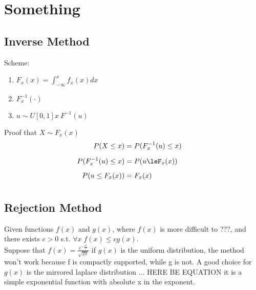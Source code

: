 
\chapter{Something}

\section{Inverse Method}
Scheme:
\begin{enumerate}
    \item $F_x(x) = \int^x_{-\infty}f_x(x)dx $
    \item $F_x^{-1}(\cdot)$
    \item  $u \sim U[0,1] x~F^{-1}(u)$
\end{enumerate}

\begin{myproof}
    Proof that $X \sim F_x(x)$\\
    \begin{equation}
        \begin{aligned}
            P(X\le x)&= P(F_x^{-1}(u)\le x)&\mbox{}\\[1.25ex]
            P(F_x^{-1}(u)\le x)&=P(u\leF_x(x))&\mbox{}\\[1.25ex]
            P(u\le F_x(x))&=F_x(x)&\mbox{}\\[1.25ex]
        \end{aligned}
    \end{equation}
\end{myproof}

\section{Rejection Method}

Given functions $f(x)$ and  $g(x)$, where  $f(x)$ is more difficult to ???, and there exists $ c > 0$ s.t.  $\forall x \; f(x) \le cg(x)$.\\

\ex{}
{
    Suppose that $f(x) = \frac{e^{-\frac{x^{2}}{2}}}{\sqrt{2\pi}}$ if $g(x)$ is the uniform distribution, the method won't work because f is compactly supported, while g is not. A good choice for  $g(x)$ is the mirrored laplace distribution ... HERE BE EQUATION it is a simple exponential function with absolute x in the exponent.
}
